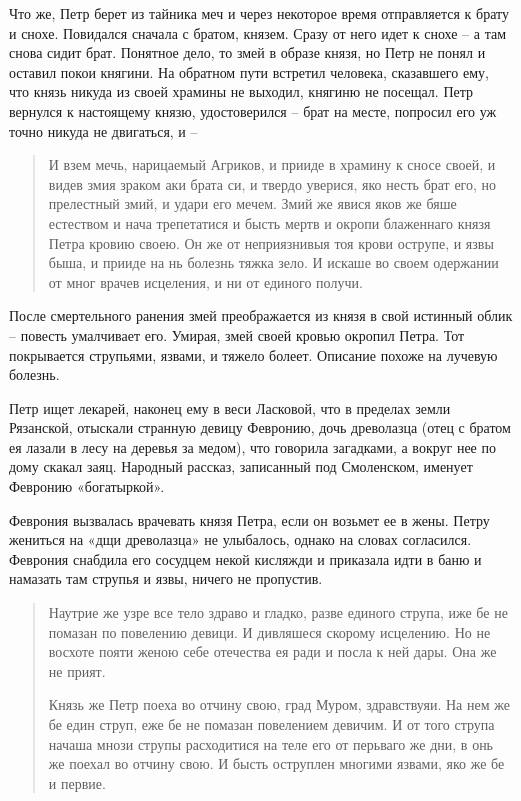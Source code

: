 Что же, Петр берет из тайника меч и через некоторое время отправляется к брату и снохе. Повидался сначала с братом, князем. Сразу от него идет к снохе – а там снова сидит брат. Понятное дело, то змей в образе князя, но Петр не понял и оставил покои княгини. На обратном пути встретил человека, сказавшего ему, что князь никуда из своей храмины не выходил, княгиню не посещал. Петр вернулся к настоящему князю, удостоверился – брат на месте, попросил его уж точно никуда не двигаться, и – 

\begin{quotation}
И взем мечь, нарицаемый Агриков, и прииде в храмину к сносе своей, и видев змия зраком аки брата си, и твердо уверися, яко несть брат его, но прелестный змий, и удари его мечем. Змий же явися яков же бяше естеством и нача трепетатися и бысть мертв и окропи блаженнаго князя Петра кровию своею. Он же от неприязнивыя тоя крови острупе, и язвы быша, и прииде на нь болезнь тяжка зело. И искаше во своем одержании от мног врачев исцеления, и ни от единого получи.
\end{quotation}

После смертельного ранения змей преображается из князя в свой истинный облик – повесть умалчивает его. Умирая, змей своей кровью окропил Петра. Тот покрывается струпьями, язвами, и тяжело болеет. Описание похоже на лучевую болезнь.

Петр ищет лекарей, наконец ему в веси Ласковой, что в пределах земли Рязанской, отыскали странную девицу Февронию, дочь древолазца (отец с братом ея лазали в лесу на деревья за медом), что говорила загадками, а вокруг нее по дому скакал заяц. Народный рассказ, записанный под Смоленском, именует Февронию «богатыркой».

Феврония вызвалась врачевать князя Петра, если он возьмет ее в жены. Петру жениться на «дщи древолазца» не улыбалось, однако на словах согласился. Феврония снабдила его сосудцем некой кисляжди и приказала идти в баню и намазать там струпья и язвы, ничего не пропустив.

\begin{quotation}
Наутрие же узре все тело здраво и гладко, разве единого струпа, иже бе не помазан по повелению девици. И дивляшеся скорому исцелению. Но не восхоте пояти женою себе отечества ея ради и посла к ней дары. Она же не прият.

Князь же Петр поеха во отчину свою, град Муром, здравствуяи. На нем же бе един струп, еже бе не помазан повелением девичим. И от того струпа начаша мнози струпы расходитися на теле его от перьваго же дни, в онь же поехал во отчину свою. И бысть оструплен многими язвами, яко же бе и первие.
\end{quotation}

